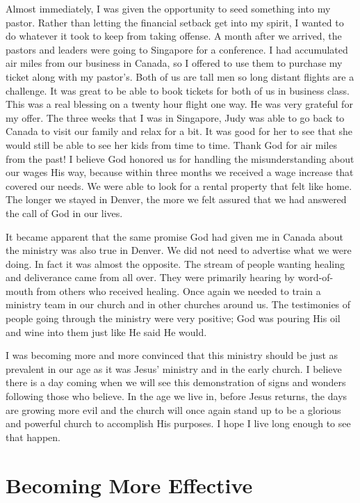 \documentclass[twoside, 12pt]{book}
\begin{document}
Almost immediately, I was given the opportunity to seed something into my pastor. Rather than letting the financial setback get into my spirit, I wanted to do whatever it took to keep from taking offense. A month after we arrived, the pastors and leaders were going to Singapore for a conference. I had accumulated air miles from our business in Canada, so I offered to use them to purchase my ticket along with my pastor’s. Both of us are tall men so long distant flights are a challenge. It was great to be able to book tickets for both of us in business class. This was a real blessing on a twenty hour flight one way. He was very grateful for my offer. The three weeks that I was in Singapore, Judy was able to go back to Canada to visit our family and relax for a bit. It was good for her to see that she would still be able to see her kids from time to time. Thank God for air miles from the past! I believe God honored us for handling the misunderstanding about our wages His way, because within three months we received a wage increase that covered our needs. We were able to look for a rental property that felt like home. The longer we stayed in Denver, the more we felt assured that we had answered the call of God in our lives.

It became apparent that the same promise God had given me in Canada about the ministry was also true in Denver. We did not need to advertise what we were doing. In fact it was almost the opposite. The stream of people wanting healing and deliverance came from all over. They were primarily hearing by word-of-mouth from others who received healing. Once again we needed to train a ministry team in our church and in other churches around us. The testimonies of people going through the ministry were very positive; God was pouring His oil and wine into them just like He said He would.

I was becoming more and more convinced that this ministry should be just as prevalent in our age as it was Jesus’ ministry and in the early church. I believe there is a day coming when we will see this demonstration of signs and wonders following those who believe. In the age we live in, before Jesus returns, the days are growing more evil and the church will once again stand up to be a glorious and powerful church to accomplish His purposes. I hope I live long enough to see that happen. 



\chapter{Becoming More Effective}
\
\end{document}
